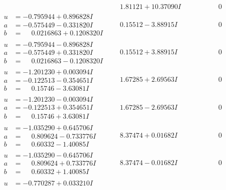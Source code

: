 \documentclass[1p]{elsarticle_modified}
\theoremstyle{definition}
\begin{document}
$$\begin{array}{c|c|c}
 & \phantom{-}1.81121 + 10.37090 I & \phantom{-0.000000 } 0 \\ \hline\begin{aligned}
u &= -0.795944 + 0.896828 I \\
a &= -0.575449 - 0.331820 I \\
b &= \phantom{-}0.0216863 + 0.1208320 I\end{aligned}
 & \phantom{-}0.15512 - 3.88915 I & \phantom{-0.000000 } 0 \\ \hline\begin{aligned}
u &= -0.795944 - 0.896828 I \\
a &= -0.575449 + 0.331820 I \\
b &= \phantom{-}0.0216863 - 0.1208320 I\end{aligned}
 & \phantom{-}0.15512 + 3.88915 I & \phantom{-0.000000 } 0 \\ \hline\begin{aligned}
u &= -1.201230 + 0.003094 I \\
a &= -0.122513 - 0.354651 I \\
b &= \phantom{-}0.15746 - 3.63081 I\end{aligned}
 & \phantom{-}1.67285 + 2.69563 I & \phantom{-0.000000 } 0 \\ \hline\begin{aligned}
u &= -1.201230 - 0.003094 I \\
a &= -0.122513 + 0.354651 I \\
b &= \phantom{-}0.15746 + 3.63081 I\end{aligned}
 & \phantom{-}1.67285 - 2.69563 I & \phantom{-0.000000 } 0 \\ \hline\begin{aligned}
u &= -1.035290 + 0.645706 I \\
a &= \phantom{-}0.809624 - 0.733776 I \\
b &= \phantom{-}0.60332 - 1.40085 I\end{aligned}
 & \phantom{-}8.37474 + 0.01682 I & \phantom{-0.000000 } 0 \\ \hline\begin{aligned}
u &= -1.035290 - 0.645706 I \\
a &= \phantom{-}0.809624 + 0.733776 I \\
b &= \phantom{-}0.60332 + 1.40085 I\end{aligned}
 & \phantom{-}8.37474 - 0.01682 I & \phantom{-0.000000 } 0 \\ \hline\begin{aligned}
u &= -0.770287 + 0.033210 I \\

\end{aligned}
\end{array}$$
\end{document}
